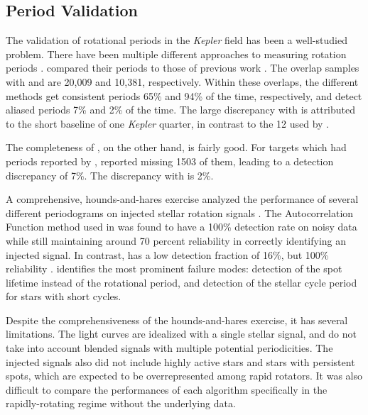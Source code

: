 \documentclass[manuscript]{aastex6}
\newcommand{\Kepler}{\mbox{\textit{Kepler}}}
\begin{document}
\subsection{Period Validation}

The validation of rotational periods in the \Kepler{} field has been a
well-studied problem. There have been multiple different approaches to
measuring rotation periods \citep{Reinhold13,Nielsen13,McQuillan14,Garcia14}.
\citet{McQuillan14} compared their periods to those of previous work
\citep{Reinhold13,Nielsen13}. The overlap samples with
\citet{Reinhold13} and \citet{Nielsen13} are 20,009 and 10,381,
respectively. Within these overlaps, the different methods get
consistent periods 65\% and 94\% of the time, respectively, and detect
aliased periods 7\% and 2\% of the time. The large discrepancy with
\citet{Reinhold} is attributed to the short baseline of one \Kepler
quarter, in contrast to the 12 used by \citet{McQuillan14}.

The completeness of \citet{McQuillan14}, on the other hand, is fairly
good. For targets which had periods reported by \citet{Reinhold13},
\citet{Mcquillan14} reported missing 1503 of them, leading to a detection
discrepancy of 7\%. The discrepancy with \citet{Nielsen13} is 2\%.

A comprehensive, hounds-and-hares exercise analyzed the performance of
several different periodograms on injected stellar rotation signals 
\citep{Aigrain15}. The Autocorrelation Function method used in 
\citet{McQuillan14} was found to have a 100\% detection rate on noisy
data while still maintaining around 70 percent reliability in correctly
identifying an injected signal. In contrast, \citet{Neilsen13} has a low
detection fraction of 16\%, but 100\% reliability \citep{Aigrain15}.
\citet{Aigrain15} identifies the most prominent failure modes: detection
of the spot lifetime instead of the rotational period, and detection of
the stellar cycle period for stars with short cycles.

Despite the comprehensiveness of the hounds-and-hares exercise, it has
several limitations. The light curves are idealized with a single
stellar signal, and do not take into account blended signals with
multiple potential periodicities. The injected signals also did not
include highly active stars and stars with persistent spots, which are
expected to be overrepresented among rapid rotators. It was also
difficult to compare the performances of each algorithm specifically in
the rapidly-rotating regime without the underlying data.
\end{document}
